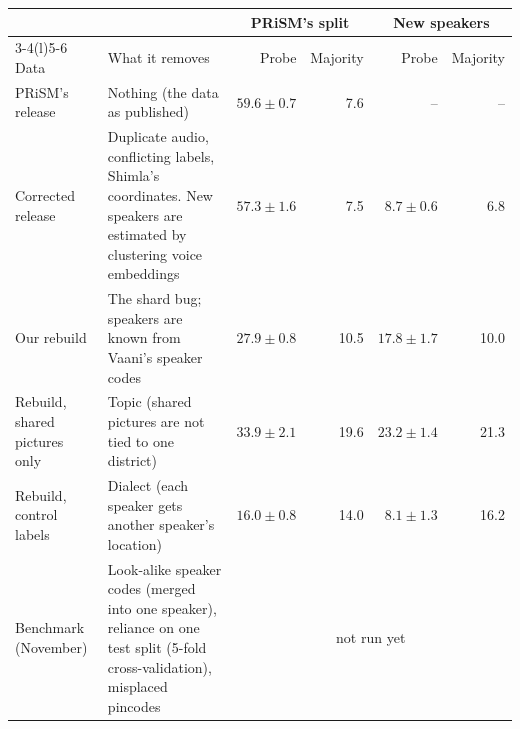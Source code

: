 \begin{tabularx}{\linewidth}{@{}p{3.6cm}>{\raggedright\arraybackslash}Xrrrr@{}}
\toprule
 & & \multicolumn{2}{c}{PRiSM's split} & \multicolumn{2}{c}{New speakers} \\
\cmidrule(lr){3-4}\cmidrule(l){5-6}
Data & What it removes & Probe & Majority & Probe & Majority \\
\midrule
PRiSM's release & Nothing (the data as published) & $59.6 \pm 0.7$ & 7.6 & -- & -- \\
Corrected release & Duplicate audio, conflicting labels, Shimla's coordinates. New speakers are estimated by clustering voice embeddings & $57.3 \pm 1.6$ & 7.5 & $8.7 \pm 0.6$ & 6.8 \\
Our rebuild & The shard bug; speakers are known from Vaani's speaker codes & $27.9 \pm 0.8$ & 10.5 & $17.8 \pm 1.7$ & 10.0 \\
Rebuild, shared pictures only & Topic (shared pictures are not tied to one district) & $33.9 \pm 2.1$ & 19.6 & $23.2 \pm 1.4$ & 21.3 \\
Rebuild, control labels & Dialect (each speaker gets another speaker's location) & $16.0 \pm 0.8$ & 14.0 & $8.1 \pm 1.3$ & 16.2 \\
Benchmark (November) & Look-alike speaker codes (merged into one speaker), reliance on one test split (5-fold cross-validation), misplaced pincodes & \multicolumn{4}{c}{not run yet} \\
\bottomrule
\end{tabularx}
